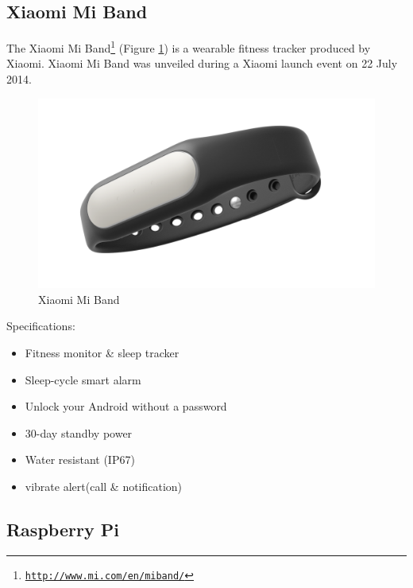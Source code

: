 \subsection{Xiaomi Mi Band}

The Xiaomi Mi Band\footnote{\href{http://www.mi.com/en/miband/}{\texttt{http://www.mi.com/en/miband/}}} (Figure \ref{fig:smartband}) is a wearable fitness tracker produced by Xiaomi. Xiaomi Mi Band was unveiled during a Xiaomi launch event on 22 July 2014.
\begin{figure}[h]
	\centering
	\includegraphics[width=0.7\linewidth]{images/smartband}
	\caption{Xiaomi Mi Band}
	\label{fig:smartband}
\end{figure}

Specifications:
\begin{itemize}
	\item Fitness monitor \& sleep tracker
	\item Sleep-cycle smart alarm
	\item Unlock your Android without a password
	\item 30-day standby power
	\item Water resistant (IP67)
	\item vibrate alert(call \& notification)
\end{itemize}

\subsection{Raspberry Pi}

